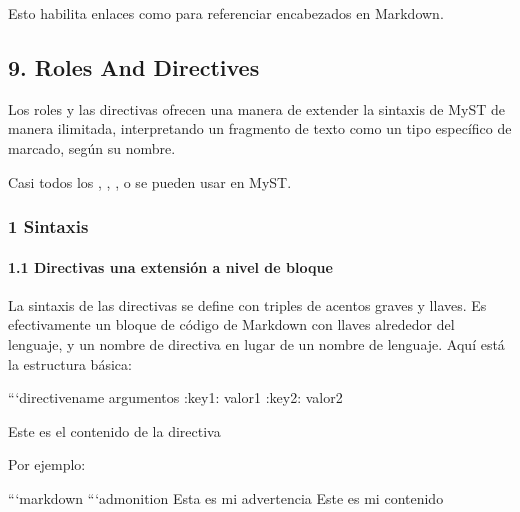 \documentclass[a4paper,10pt,spanish]{sphinxmanual}
\begin{document}
\sphinxAtStartPar
Esto habilita enlaces como  para referenciar encabezados en Markdown.


\subsection{9. Roles And Directives}
\label{\detokenize{configuracion_inicial/013.guia_de_myst_parser:roles-and-directives}}
\sphinxAtStartPar
Los roles y las directivas ofrecen una manera de extender la sintaxis de MyST de manera ilimitada,
interpretando un fragmento de texto como un tipo específico de marcado, según su nombre.

\sphinxAtStartPar
Casi todos los ,
,
, o 
se pueden usar en MyST.


\subsubsection{1 Sintaxis}
\label{\detokenize{configuracion_inicial/013.guia_de_myst_parser:sintaxis}}

\paragraph{1.1 Directivas \sphinxhyphen{} una extensión a nivel de bloque}
\label{\detokenize{configuracion_inicial/013.guia_de_myst_parser:directivas-una-extension-a-nivel-de-bloque}}
\sphinxAtStartPar
La sintaxis de las directivas se define con triples de acentos graves y llaves.
Es efectivamente un bloque de código de Markdown con llaves alrededor del lenguaje, y un nombre de directiva en lugar de un nombre de lenguaje.
Aquí está la estructura básica:

\begin{sphinxVerbatim}[commandchars=\\\{\}]
```\PYGZob{}directivename\PYGZcb{} argumentos
:key1: valor1
:key2: valor2

Este es el contenido de la directiva
\end{sphinxVerbatim}

\begin{sphinxVerbatim}[commandchars=\\\{\}]

Por ejemplo:

```markdown
```\PYGZob{}admonition\PYGZcb{} Esta es mi advertencia
Este es mi contenido
\end{sphinxVerbatim}
\end{document}
